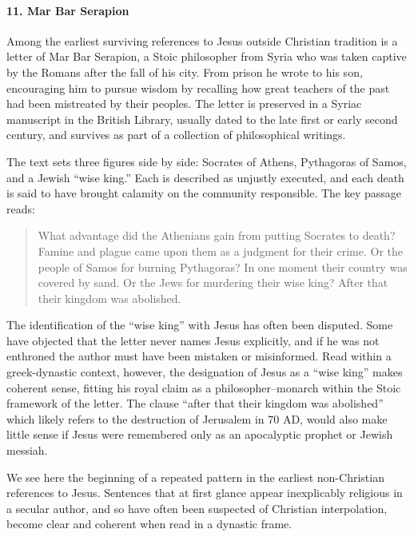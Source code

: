 \paragraph{11.
Mar Bar Serapion}\label{par:mar-bar-serapion}

Among the earliest surviving references to Jesus outside Christian tradition is a letter of Mar Bar Serapion, a Stoic philosopher from Syria who was taken captive by the Romans after the fall of his city.
From prison he wrote to his son, encouraging him to pursue wisdom by recalling how great teachers of the past had been mistreated by their peoples.
The letter is preserved in a Syriac manuscript in the British Library, usually dated to the late first or early second century, and survives as part of a collection of philosophical writings.

The text sets three figures side by side: Socrates of Athens, Pythagoras of Samos, and a Jewish “wise king.”
Each is described as unjustly executed, and each death is said to have brought calamity on the community responsible.
The key passage reads:
\begin{quote}
    What advantage did the Athenians gain from putting Socrates to death?
    Famine and plague came upon them as a judgment for their crime.
    Or the people of Samos for burning Pythagoras?
    In one moment their country was covered by sand.
    Or the Jews for murdering their wise king?
    After that their kingdom was abolished.
\end{quote}

The identification of the “wise king” with Jesus has often been disputed.
Some have objected that the letter never names Jesus explicitly, and if he was not enthroned the author must have been mistaken or misinformed.
Read within a greek-dynastic context, however, the designation of Jesus as a “wise king” makes coherent sense, fitting his royal claim as a philosopher–monarch within the Stoic framework of the letter.
The clause “after that their kingdom was abolished” which likely refers to the destruction of Jerusalem in 70 AD, would also make little sense if Jesus were remembered only as an apocalyptic prophet or Jewish messiah.


We see here the beginning of a repeated pattern in the earliest non-Christian references to Jesus.
Sentences that at first glance appear inexplicably religious in a secular author, and so have often been suspected of Christian interpolation, become clear and coherent when read in a dynastic frame.

